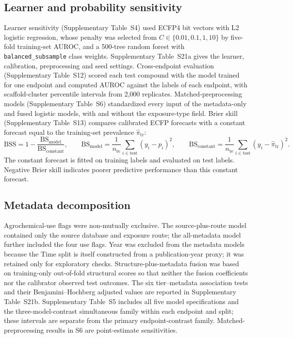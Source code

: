 \documentclass[10pt]{article}
\begin{document}
\subsection*{Learner and probability sensitivity}
Learner sensitivity (Supplementary Table~S4) used ECFP4 bit vectors with L2 logistic regression, whose penalty was selected from \(C\in\{0.01,0.1,1,10\}\) by five-fold training-set AUROC, and a 500-tree random forest with \texttt{balanced\_subsample} class weights. Supplementary Table~S21a gives the learner, calibration, preprocessing and seed settings. Cross-endpoint evaluation (Supplementary Table~S12) scored each test compound with the model trained for one endpoint and computed AUROC against the labels of each endpoint, with scaffold-cluster percentile intervals from 2,000 replicates. Matched-preprocessing models (Supplementary Table~S6) standardized every input of the metadata-only and fused logistic models, with and without the exposure-type field. Brier skill (Supplementary Table~S13) compares calibrated ECFP forecasts with a constant forecast equal to the training-set prevalence \(\widehat\pi_{\mathrm{tr}}\):
\begin{equation}
\mathrm{BSS}=1-\frac{\mathrm{BS}_{\mathrm{model}}}{\mathrm{BS}_{\mathrm{constant}}},\qquad
\mathrm{BS}_{\mathrm{model}}=\frac1{n_{\mathrm{te}}}\sum_{i\in\mathrm{test}}(y_i-p_i)^2,\qquad
\mathrm{BS}_{\mathrm{constant}}=\frac1{n_{\mathrm{te}}}\sum_{i\in\mathrm{test}}(y_i-\widehat\pi_{\mathrm{tr}})^2.
\end{equation}
The constant forecast is fitted on training labels and evaluated on test labels. Negative Brier skill indicates poorer predictive performance than this constant forecast.

\subsection*{Metadata decomposition}
Agrochemical-use flags were non-mutually exclusive. The source-plus-route model contained only the source database and exposure route; the all-metadata model further included the four use flags. Year was excluded from the metadata models because the Time split is itself constructed from a publication-year proxy; it was retained only for exploratory checks. Structure-plus-metadata fusion was based on training-only out-of-fold structural scores so that neither the fusion coefficients nor the calibrator observed test outcomes.
The six tier--metadata association tests and their Benjamini--Hochberg adjusted values are reported in Supplementary Table~S21b. Supplementary Table~S5 includes all five model specifications and the three-model-contrast simultaneous family within each endpoint and split; these intervals are separate from the primary endpoint-contrast family. Matched-preprocessing results in S6 are point-estimate sensitivities.
\end{document}
